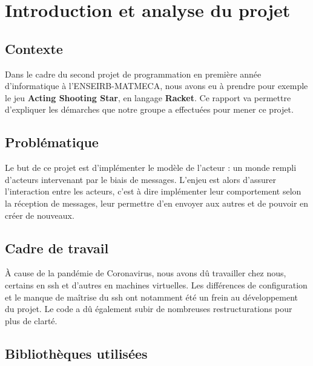 \documentclass{article}
\begin{document}
\section{Introduction et analyse du projet}
\subsection{Contexte}
Dans le cadre du second projet de programmation en première année d'informatique à l'ENSEIRB-MATMECA, nous avons eu à prendre pour exemple le jeu \textbf{Acting Shooting Star}, en langage \textbf{Racket}. Ce rapport va permettre d'expliquer les démarches que notre groupe a effectuées pour mener ce projet.

\subsection{Problématique}
Le but de ce projet est d'implémenter le modèle de l'acteur : un monde rempli d'acteurs intervenant par le biais de messages. L'enjeu est alors d'assurer l'interaction entre les acteurs, c'est à dire implémenter leur comportement selon la réception de messages, leur permettre d'en envoyer aux autres et de pouvoir en créer de nouveaux.


\subsection{Cadre de travail}
À cause de la pandémie de Coronavirus, nous avons dû travailler chez nous, certains en ssh et d'autres en machines virtuelles. Les différences de configuration et le manque de maîtrise du ssh ont notamment été un frein au développement du projet. Le code a dû également subir de nombreuses restructurations pour plus de clarté.

\subsection{Bibliothèques utilisées}
\end{document}
